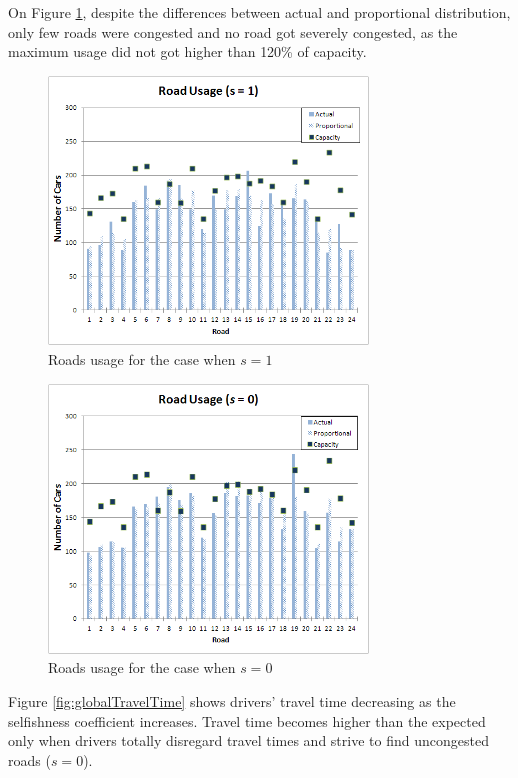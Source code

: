 \documentclass[12pt]{article}
\begin{document}
On Figure \ref{fig:roadsusage}, despite the differences between actual and proportional distribution, only few roads were congested and no road got severely congested, as the maximum usage did not got higher than 120\% of capacity.

\begin{figure}[ht]
    \centerline{\includegraphics[width=8.5cm]{img/roadsUsage.png}}
    \caption{Roads usage for the case when $s=1$}
    \label{fig:roadsusage}

\end{figure}

\begin{figure}[ht]
    \centerline{\includegraphics[width=8.5cm]{img/roadsUsage_s0.png}}
    \caption{Roads usage for the case when $s=0$}
    \label{fig:roadsusage_s0}
\end{figure}

Figure \ref{fig:globalTravelTime} shows drivers' travel time decreasing as the selfishness coefficient increases. Travel time becomes higher than the expected only when drivers totally  disregard travel times and strive to find uncongested roads ($s=0$).
\end{document}
